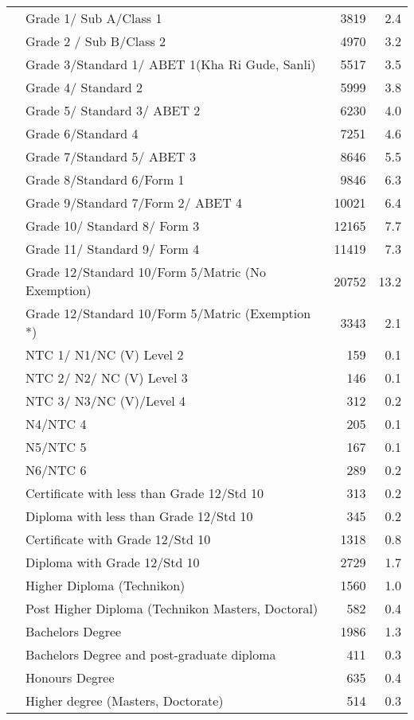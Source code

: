 \documentclass[preprint,review,authoryear, 3p,times]{elsarticle}\usepackage[]{graphicx}\usepackage[]{color}
\begin{document}
{\begin{longtable}{ll|rr}
   & Grade 1/ Sub A/Class 1 & 3819 & 2.4 \\ 
   & Grade 2 / Sub B/Class 2 & 4970 & 3.2 \\ 
   & Grade 3/Standard 1/ ABET 1(Kha Ri Gude, Sanli) & 5517 & 3.5 \\ 
   & Grade 4/ Standard 2 & 5999 & 3.8 \\ 
   & Grade 5/ Standard 3/ ABET 2 & 6230 & 4.0 \\ 
   & Grade 6/Standard 4 & 7251 & 4.6 \\ 
   & Grade 7/Standard 5/ ABET 3 & 8646 & 5.5 \\ 
   & Grade 8/Standard 6/Form 1 & 9846 & 6.3 \\ 
   & Grade 9/Standard 7/Form 2/ ABET 4 & 10021 & 6.4 \\ 
   & Grade 10/ Standard 8/ Form 3 & 12165 & 7.7 \\ 
   & Grade 11/ Standard 9/ Form 4 & 11419 & 7.3 \\ 
   & Grade 12/Standard 10/Form 5/Matric (No Exemption) & 20752 & 13.2 \\ 
   & Grade 12/Standard 10/Form 5/Matric (Exemption *) & 3343 & 2.1 \\ 
   & NTC 1/ N1/NC (V) Level 2 & 159 & 0.1 \\ 
   & NTC 2/ N2/ NC (V) Level 3 & 146 & 0.1 \\ 
   & NTC 3/ N3/NC (V)/Level 4 & 312 & 0.2 \\ 
   & N4/NTC 4 & 205 & 0.1 \\ 
   & N5/NTC 5 & 167 & 0.1 \\ 
   & N6/NTC 6 & 289 & 0.2 \\ 
   & Certificate with less than Grade 12/Std 10 & 313 & 0.2 \\ 
   & Diploma with less than Grade 12/Std 10 & 345 & 0.2 \\ 
   & Certificate with Grade 12/Std 10 & 1318 & 0.8 \\ 
   & Diploma with Grade 12/Std 10 & 2729 & 1.7 \\ 
   & Higher Diploma (Technikon) & 1560 & 1.0 \\ 
   & Post Higher Diploma (Technikon Masters, Doctoral) & 582 & 0.4 \\ 
   & Bachelors Degree & 1986 & 1.3 \\ 
   & Bachelors Degree and post-graduate diploma & 411 & 0.3 \\ 
   & Honours Degree & 635 & 0.4 \\ 
   & Higher degree (Masters, Doctorate) & 514 & 0.3 \\ 

\end{longtable}}
\end{document}
